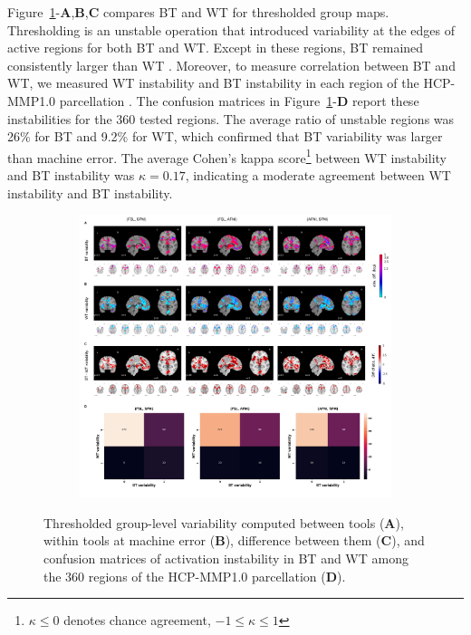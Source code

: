 \documentclass[11pt,onecolumn]{article}
\begin{document}
Figure~\ref{fig:thresh-maps}-\textbf{A},\textbf{B},\textbf{C} compares BT
and WT for thresholded group maps. Thresholding is an unstable operation
that introduced variability at the edges of
active regions for both BT and WT. Except in these regions, BT remained consistently larger
than WT . Moreover, to measure correlation between BT and WT, we
measured WT instability and BT instability in each region of the
HCP-MMP1.0 parcellation . The confusion matrices in
Figure~\ref{fig:thresh-maps}-\textbf{D} report these instabilities for
the 360 tested regions. The average ratio of unstable regions was 26\%
for BT and 9.2\% for WT, which confirmed that BT variability was larger than machine error.
The average Cohen's kappa score\footnote{$\kappa \leq 0$ denotes chance agreement, $-1 \leq \kappa \leq 1$}
between WT instability and BT instability was $\kappa=0.17$, indicating
a moderate agreement between WT instability and BT instability.

\begin{figure}[ht]
  \begin{subfigure}[ht]{\textwidth}
    \centering
    \includegraphics[width=\textwidth]{figures/abs/gl-thresh.png}
  \end{subfigure}
  \centering
  \caption{Thresholded group-level variability computed between tools (\textbf{A}),
    within tools at machine error (\textbf{B}), difference between them (\textbf{C}), and
    confusion matrices of activation instability
    in BT and WT among the 360 regions of the HCP-MMP1.0 parcellation (\textbf{D}).}
  \label{fig:thresh-maps}
\end{figure}
\end{document}
